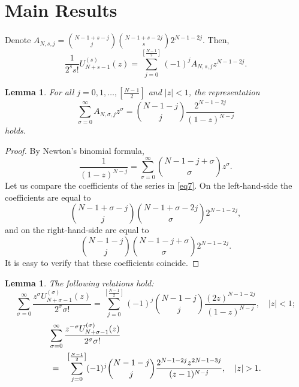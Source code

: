 \documentclass{article}
\newtheorem{lemma}[thm]{Lemma}
\begin{document}
\section{Main Results}

Denote $A_{N,s,j} = {N - 1 + s - j \choose j}{N - 1 + s - 2j \choose s}2^{N - 1 - 2j}$. Then,
\begin{equation}\label{eq6}
\frac{1}{2^s s!}U_{N + s - 1}^{(s)}(z) = \sum_{j = 0}^{\left[\frac{N - 1}{2}\right]}(-1)^jA_{N,s,j}z^{N-1-2j}.
\end{equation}

\begin{lemma}\label{lem2}
For all $j = 0, 1, \ldots, \left[\frac{N-1}{2}\right]$ and $|z| < 1$, the representation
\begin{equation}\label{eq7}
\sum_{\sigma = 0}^{\infty}A_{N,\sigma,j}z^\sigma = {N - 1 - j \choose j}\frac{2^{N - 1 - 2j}}{(1 - z)^{N - j}}
\end{equation}
holds.
\end{lemma}

\begin{proof}
By Newton's binomial formula,
$$
\frac{1}{(1 - z)^{N - j}} = \sum_{\sigma = 0}^{\infty}{N - 1 - j + \sigma \choose \sigma}z^\sigma.
$$
Let us compare the coefficients of the series in \eqref{eq7}. On the left-hand-side the coefficients are equal to
$$
{N - 1 + \sigma - j \choose j}{N - 1 + \sigma - 2j \choose \sigma}2^{N - 1 - 2j},
$$
and on the right-hand-side are equal to
$$
{N - 1 - j \choose j}{N - 1 - j + \sigma \choose \sigma}2^{N - 1- 2j}.
$$
It is easy to verify that these coefficients coincide.
\end{proof}

\begin{lemma}\label{lem3}
The following relations hold:
\begin{equation}\label{eq8}
\sum_{\sigma = 0}^{\infty}\frac{z^\sigma U_{N+\sigma-1}^{(\sigma)}(z)}{2^\sigma \sigma!} = \sum_{j = 0}^{\left[\frac{N-1}{2}\right]}(-1)^j{N-1-j \choose j}\frac{(2z)^{N-1-2j}}{(1-z)^{N-j}}, \quad |z| < 1;
\end{equation}
\begin{eqnarray}\label{eq9}
\lefteqn{\sum_{\sigma = 0}^{\infty}\frac{z^{-\sigma} U_{N+\sigma-1}^{(\sigma)}(z)}{2^\sigma \sigma!}} \nonumber \\
&=& \sum_{j = 0}^{\left[\frac{N-1}{2}\right]}(-1)^j{N-1-j \choose j}\frac{2^{N-1-2j}z^{2N-1-3j}}{(z - 1)^{N-j}}, \quad |z| > 1.
\end{eqnarray}
\end{lemma}
\end{document}

